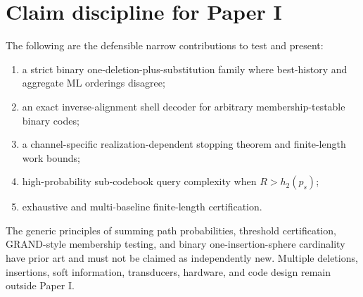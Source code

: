\documentclass[11pt]{article}
\theoremstyle{remark}
\begin{document}
\section{Claim discipline for Paper I}
The following are the defensible narrow contributions to test and present:
\begin{enumerate}
 \item a strict binary one-deletion-plus-substitution family where best-history and aggregate ML
       orderings disagree;
 \item an exact inverse-alignment shell decoder for arbitrary membership-testable binary codes;
 \item a channel-specific realization-dependent stopping theorem and finite-length work bounds;
 \item high-probability sub-codebook query complexity when $R>h_2(p_s)$;
 \item exhaustive and multi-baseline finite-length certification.
\end{enumerate}
The generic principles of summing path probabilities, threshold certification, GRAND-style
membership testing, and binary one-insertion-sphere cardinality have prior art and must not be
claimed as independently new.  Multiple deletions, insertions, soft information, transducers,
hardware, and code design remain outside Paper I.
\end{document}
